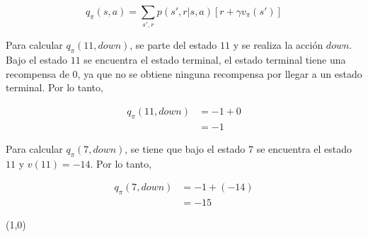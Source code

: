 \[
    q_{\pi}(s,a) = \sum_{s',r} p(s',r|s,a) \left[ r + \gamma v_{\pi}(s') \right]
\]

Para calcular $q_{\pi}(11,down)$, se parte del estado $11$ y se realiza la acción $down$.
Bajo el estado $11$ se encuentra el estado terminal, el estado terminal tiene una recompensa de $0$, ya que no se obtiene ninguna recompensa por llegar a un estado terminal.
Por lo tanto,

\begin{align*}
    q_{\pi}(11,down) &= -1 + 0 \\
    &= -1
\end{align*}

Para calcular $q_{\pi}(7,down)$, se tiene que bajo el estado $7$ se encuentra el estado $11$ y $v(11)=-14$.
Por lo tanto,

\begin{align*}
    q_{\pi}(7,down) &= -1 + (-14) \\
    &= -15
\end{align*}


\line(1,0){\textwidth}
